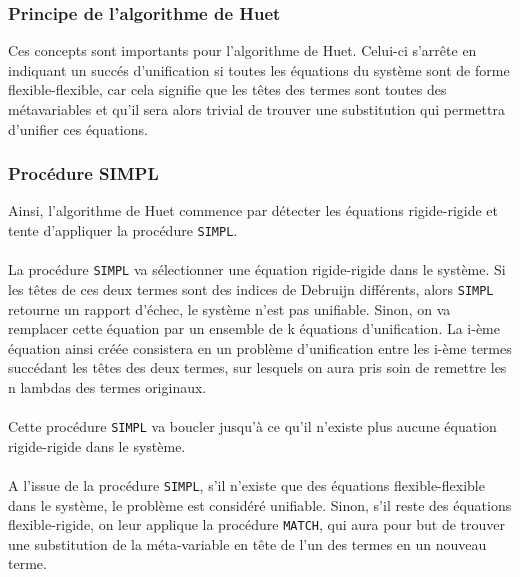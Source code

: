 \subsubsection{Principe de l'algorithme de Huet}
Ces concepts sont importants pour l'algorithme de Huet. Celui-ci s'arrête en indiquant un succés d'unification si toutes les équations du système sont de forme flexible-flexible, car cela signifie que les têtes des termes sont toutes des métavariables et qu'il sera alors trivial de trouver une substitution qui permettra d'unifier ces équations.


\subsubsection{Procédure SIMPL}
Ainsi, l'algorithme de Huet commence par détecter les équations rigide-rigide et tente d'appliquer la procédure \verb?SIMPL?.
\paragraph{}

La procédure \verb?SIMPL? va sélectionner une équation rigide-rigide dans le système. Si les têtes de ces deux termes sont des indices de Debruijn différents, alors \verb?SIMPL? retourne un rapport d'échec, le système n'est pas unifiable. Sinon, on va remplacer cette équation par un ensemble de k équations d'unification. La i-ème équation ainsi créée consistera en un problème d'unification entre les i-ème termes succédant les têtes des deux termes, sur lesquels on aura pris soin de remettre les n lambdas des termes originaux. 

\paragraph{}
Cette procédure \verb?SIMPL? va boucler jusqu'à ce qu'il n'existe plus aucune équation rigide-rigide dans le système.

\paragraph{}
A l'issue de la procédure \verb?SIMPL?, s'il n'existe que des équations flexible-flexible dans le système, le problème est considéré unifiable. Sinon, s'il reste des équations flexible-rigide, on leur applique la procédure \verb?MATCH?, qui aura pour but de trouver une substitution de la méta-variable en tête de l'un des termes en un nouveau terme.

